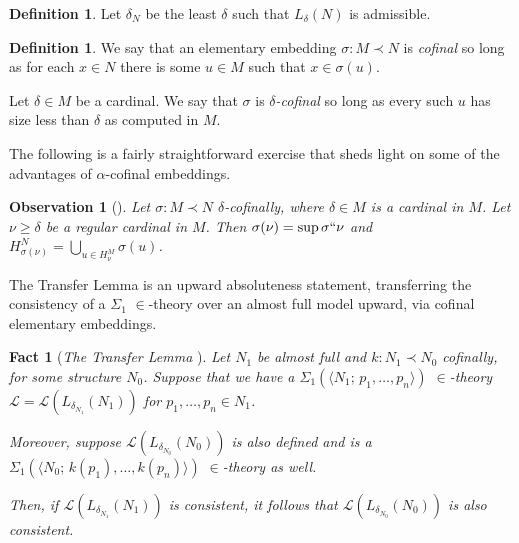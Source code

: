 \documentclass{amsart}
\newtheorem{observation}[theorem]{Observation}
\newtheorem{fact}[theorem]{Fact}
\theoremstyle{definition}
\newtheorem{definition}[theorem]{Definition}
\theoremstyle{remark}
\begin{document}
\begin{definition} Let $\delta_N$ be the least $\delta$ such that $L_\delta(N)$ is admissible. \end{definition}

\begin{definition} We say that an elementary embedding $\sigma: M \prec N$ is \emph{cofinal} so long as for each $x \in N$ there is some $u \in M$ such that $x \in \sigma(u)$. 

Let $\delta \in M$ be a cardinal. We say that $\sigma$ is \emph{$\delta$-cofinal} so long as every such $u$ has size less than $\delta$ as computed in $M$. \end{definition}

The following is a fairly straightforward exercise that sheds light on some of the advantages of $\alpha$-cofinal embeddings.

\begin{observation}[{\cite[Cor. 3.7]{Jensen:2014}}] \label{observation:regularitySups}
Let $\sigma:M \prec N$ $\delta$-cofinally, where $\delta \in M$ is a cardinal in $M$. Let $\nu \geq \delta$ be a regular cardinal in $M$. Then $\sigma(\nu)=\sup \sigma``\nu$ and $H_{\sigma(\nu)}^N=\bigcup_{u \in H_\nu^M}\sigma(u)$.
\end{observation}

The Transfer Lemma is an upward absoluteness statement, transferring the consistency of a $\Sigma_1$ $\in$-theory over an almost full model upward, via cofinal elementary embeddings. 

\begin{fact}[\emph{The Transfer Lemma} {\cite[Lemma 4.5]{Jensen:2014}}]\label{fact:Transfer} Let $N_1$ be almost full and $k: N_1 \prec N_0$ cofinally, for some structure $N_0$. Suppose that we have a $\Sigma_1(\langle N_1; \, p_1, \dots, p_n\rangle)$  $\in$-theory $\mathcal L=\mathcal L(L_{\delta_{N_1}}(N_1))$  for $p_1, \dots, p_n \in N_1$.

Moreover, suppose $\mathcal L(L_{\delta_{N_0}}(N_0))$ is also defined and is a $\Sigma_1(\langle N_0; \, k(p_1), \dots, k(p_n)\rangle)$ $\in$-theory as well. 

Then, 
if $\mathcal L(L_{\delta_{N_1}}(N_1))$ is consistent, it follows that $\mathcal L(L_{\delta_{N_0}}(N_0))$ is also consistent. \end{fact} 
\end{document}
